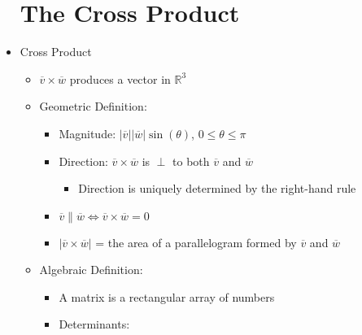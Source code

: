 \begin{itemize}
\begin{itemize}
      \end{itemize}
      
  \section{The Cross Product}

    \item Cross Product

      \begin{itemize}

        \item $\overline{v}\times\overline{w}$ produces a vector in $\mathbb{R}^3$

        \item Geometric Definition: 

          \begin{itemize}

            \item Magnitude: $|\overline{v}||\overline{w}|\sin(\theta)$, $0\leq\theta\leq\pi$

            \item Direction: $\overline{v}\times\overline{w}$ is $\perp$ to both $\overline{v}$ and $\overline{w}$

              \begin{itemize}

                \item Direction is uniquely determined by the right-hand rule

              \end{itemize}

            \item $\overline{v} \parallel \overline{w} \Leftrightarrow \overline{v}\times\overline{w} = 0$

            \item $|\overline{v}\times\overline{w}|$ = the area of a parallelogram formed by $\overline{v}$ and $\overline{w}$

          \end{itemize}

        \item Algebraic Definition:

          \begin{itemize}

              \item A matrix is a rectangular array of numbers

              \item Determinants:


\end{itemize}
\end{itemize}
\end{itemize}
